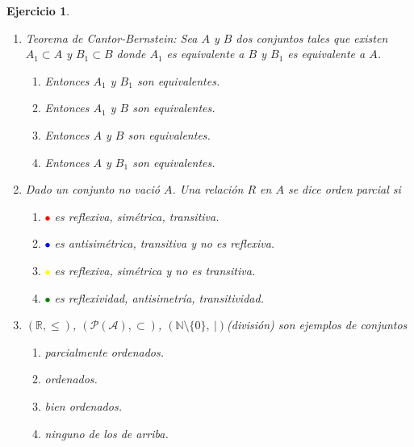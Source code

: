 \documentclass[twoside,12pt,a4 paper,openright]{book}
\newtheorem{ejer}[claim]{Ejercicio}
\begin{document}
\begin{ejer}
\begin{enumerate}
\item  Teorema de Cantor-Bernstein: Sea $A$ y $B$ dos conjuntos tales que existen $A_1\subset A$ y $B_1\subset B$ donde $A_1$ es equivalente a $B$ y $B_1$ es equivalente a $A$. 
          {\small
    \begin{enumerate}
\item[\textcolor{red}{$\bullet$}] {} Entonces $A_1$ y $B_1$ son equivalentes. 
\item[\textcolor{blue}{$\bullet$}] {} Entonces $A_1$ y $B$ son equivalentes. 
\item[\textcolor{yellow}{$\bullet$}] {}  Entonces $A$ y $B$ son equivalentes. 
\item[\textcolor{green}{$\bullet$}] {}  Entonces $A$ y $B_1$ son equivalentes. 
\end{enumerate}
}
 

\newpage


\item Dado un conjunto no vaci\'o $A$. Una relaci\'on $R$ en $A$ se dice orden parcial si 
          {\small
    \begin{enumerate}
\item  \textcolor{red}{$\bullet$} {} es  reflexiva, sim\'etrica, transitiva. 
\item  \textcolor{blue}{$\bullet$} {} es  antisim\'etrica, transitiva y no es reflexiva. 
\item  \textcolor{yellow}{$\bullet$} {} es  reflexiva, sim\'etrica y no es  transitiva. 
\item  \textcolor{green}{$\bullet$} {} es  reflexividad, antisimetr\'ia, transitividad. 
\end{enumerate}
}

\newpage



\item  $( \mathbb{R}, \leq )$, $(\mathcal{P(A)}, \subset )$,  $(\mathbb{N}\setminus\{0\}, \ | )$(divisi\'on) 
 son ejemplos de conjuntos 
          {\small
    \begin{enumerate}
\item[\textcolor{red}{$\bullet$}] {} parcialmente ordenados. 
\item[\textcolor{blue}{$\bullet$}] {} ordenados. 
\item[\textcolor{yellow}{$\bullet$}] {} bien ordenados. 
\item[\textcolor{green}{$\bullet$}] {} ninguno de los de arriba. 
\end{enumerate}
}



\end{enumerate}
\end{ejer}
\end{document}
